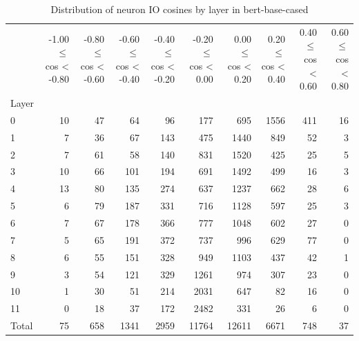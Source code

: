 \begin{table}
\caption{Distribution of neuron IO cosines by layer in bert-base-cased}
\label{tab:bert-base-cased_half_coarse}
\begin{tabular}{lrrrrrrrrr}
 & -1.00 $\leq$ cos < -0.80 & -0.80 $\leq$ cos < -0.60 & -0.60 $\leq$ cos < -0.40 & -0.40 $\leq$ cos < -0.20 & -0.20 $\leq$ cos < 0.00 & 0.00 $\leq$ cos < 0.20 & 0.20 $\leq$ cos < 0.40 & 0.40 $\leq$ cos < 0.60 & 0.60 $\leq$ cos < 0.80 \\
Layer &  &  &  &  &  &  &  &  &  \\
0 & 10 & 47 & 64 & 96 & 177 & 695 & 1556 & 411 & 16 \\
1 & 7 & 36 & 67 & 143 & 475 & 1440 & 849 & 52 & 3 \\
2 & 7 & 61 & 58 & 140 & 831 & 1520 & 425 & 25 & 5 \\
3 & 10 & 66 & 101 & 194 & 691 & 1492 & 499 & 16 & 3 \\
4 & 13 & 80 & 135 & 274 & 637 & 1237 & 662 & 28 & 6 \\
5 & 6 & 79 & 187 & 331 & 716 & 1128 & 597 & 25 & 3 \\
6 & 7 & 67 & 178 & 366 & 777 & 1048 & 602 & 27 & 0 \\
7 & 5 & 65 & 191 & 372 & 737 & 996 & 629 & 77 & 0 \\
8 & 6 & 55 & 151 & 328 & 949 & 1103 & 437 & 42 & 1 \\
9 & 3 & 54 & 121 & 329 & 1261 & 974 & 307 & 23 & 0 \\
10 & 1 & 30 & 51 & 214 & 2031 & 647 & 82 & 16 & 0 \\
11 & 0 & 18 & 37 & 172 & 2482 & 331 & 26 & 6 & 0 \\
Total & 75 & 658 & 1341 & 2959 & 11764 & 12611 & 6671 & 748 & 37 \\
\end{tabular}
\end{table}

